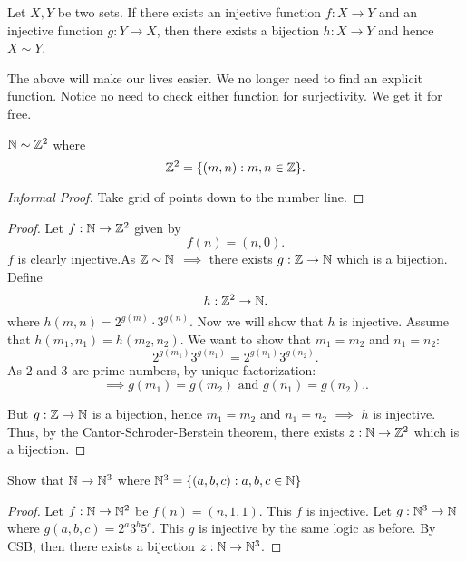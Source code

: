 \begin{theorem}
	Let $X, Y$ be two sets. If there exists an injective function $f: X \to Y$ and an injective function $g: Y \to X$, then there exists a bijection $h: X \to Y$ and hence $X \sim Y$.
\end{theorem}

The above will make our lives easier. We no longer need to find an explicit function. Notice no need to check either function for surjectivity. We get it for free.

\begin{theorem}
	$\mathbb{N} \sim \mathbb{Z}^{2}$ where
	\[
		\mathbb{Z}^{2} = \{\left( m,n \right)  : m, n \in \mathbb{Z}\}
	.\] 
\end{theorem}

\begin{proof}[Informal Proof]
	Take grid of points down to the number line.
\end{proof}

\begin{proof}
	Let $f: \mathbb{N} \to \mathbb{Z}^{2}$ given by 
	\[
		f\left( n \right) = \left( n, 0 \right) 
	.\] 
	$f$ is clearly injective.As $\mathbb{Z} \sim \mathbb{N}$  $\implies$ there exists $g: \mathbb{Z} \to \mathbb{N}$ which is a bijection. Define
	\[
	h: \mathbb{Z}^{2} \to \mathbb{N}	
	.\] 
	where $h\left( m, n \right) = 2^{g\left( m \right) } \cdot 3^{g\left( n \right) }$. Now we will show that $h$ is injective. Assume that $h\left( m_1, n_1 \right) = h\left( m_2, n_2 \right) $. We want to show that $m_1 = m_2$ and $n_1 = n_2$:
	\[
	2^{g\left( m_1 \right) } 3^{g\left( n_1 \right) } = 2^{g\left( n_1 \right)}3^{g\left( n_2 \right) }
	.\] 
	As $2$ and $3$ are prime numbers, by unique factorization:
	\[
	\implies g\left( m_1 \right) = g\left( m_2 \right) \text{ and } g\left( n_1 \right)  = g\left( n_2 \right).
	.\] 

	But $g: \mathbb{Z} \to \mathbb{N}$ is a bijection, hence $m_1 = m_2$ and $n_1 = n_2$ $\implies$ $h$ is injective. Thus, by the Cantor-Schroder-Berstein theorem, there exists $z: \mathbb{N} \to \mathbb{Z}^{2}$ which is a bijection.
\end{proof}


\begin{theorem}
	Show that $\mathbb{N} \to \mathbb{N}^{3}$ where $\mathbb{N}^{3} = \{\left( a, b, c \right) : a, b, c \in \mathbb{N}\}$
\end{theorem}

\begin{proof}
	Let $f: \mathbb{N} \to \mathbb{N}^{2}$ be $f\left( n \right) =  \left( n, 1, 1 \right) $. This $f$ is injective. Let $g: \mathbb{N}^{3} \to \mathbb{N}$ where $g\left( a, b, c \right) = 2^{a}3^{b}5^{c}$. This $g$ is injective by the same logic as before. By CSB, then there exists a bijection $z: \mathbb{N} \to \mathbb{N}^{3}$.
\end{proof}


